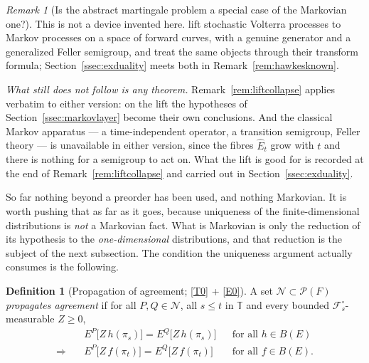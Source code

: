 \documentclass[11pt,a4paper]{article}
\theoremstyle{plain}
\theoremstyle{definition}
\newtheorem{definition}[theorem]{Definition}
\theoremstyle{remark}
\newtheorem{remark}[theorem]{Remark}
\newcommand{\T}{\mathbb{T}}                     %
\newcommand{\Bdd}{B}                           %
\newcommand{\Prob}{\mathcal{P}}                %
\newcommand{\Filt}{\mathcal{F}}
\newcommand{\ALP}{\cite{ALP19}}
\newcommand{\CT}{\cite{CT20}}
\begin{document}
\begin{remark}[Is the abstract martingale problem a special case of the Markovian one?]
  This is not a device invented here.  \CT{} lift stochastic Volterra processes
  to Markov processes on a space of forward curves, with a genuine generator and
  a generalized Feller semigroup, and \ALP{} treat the same objects through their
  transform formula; Section~\ref{ssec:exduality} meets both in
  Remark~\ref{rem:hawkesknown}.

  \emph{What still does not follow is any theorem.}  Remark~\ref{rem:liftcollapse}
  applies verbatim to either version: on the lift the hypotheses of
  Section~\ref{ssec:markovlayer} become their own conclusions.  And the classical
  Markov apparatus --- a time-independent operator, a transition semigroup, Feller
  theory --- is unavailable in either version, since the fibres $\hat{E}_t$ grow
  with $t$ and there is nothing for a semigroup to act on.  What the lift is good
  for is recorded at the end of Remark~\ref{rem:liftcollapse} and carried out in
  Section~\ref{ssec:exduality}.
\end{remark}

So far nothing beyond a preorder has been used, and nothing Markovian.  It is
worth pushing that as far as it goes, because uniqueness of the
finite-dimensional distributions is \emph{not} a Markovian fact.  What is
Markovian is only the reduction of its hypothesis to the \emph{one-dimensional}
distributions, and that reduction is the subject of the next subsection.  The
condition the uniqueness argument actually consumes is the following.

\begin{definition}[Propagation of agreement; \eqref{T0} + \eqref{E0}]
  \label{def:propagation}
  A set $\mathcal{N} \subset \Prob(F)$ \emph{propagates agreement} if for all
  $P, Q \in \mathcal{N}$, all $s \leq t$ in $\T$ and every bounded
  $\Filt^\circ_s$-measurable $Z \geq 0$,
  \begin{equation}
    \label{eq:propagation}
    \begin{aligned}
      &E^P\bigl[ Z \, h(\pi_s) \bigr] = E^Q\bigl[ Z \, h(\pi_s) \bigr]
        &&\text{for all } h \in \Bdd(E) \\
      \Longrightarrow\quad
      &E^P\bigl[ Z \, f(\pi_t) \bigr] = E^Q\bigl[ Z \, f(\pi_t) \bigr]
        &&\text{for all } f \in \Bdd(E) .
    \end{aligned}
  \end{equation}
\end{definition}
\end{document}
